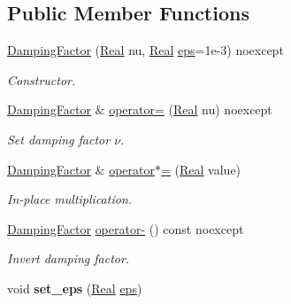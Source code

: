 \subsection*{\-Public \-Member \-Functions}
\begin{DoxyCompactItemize}
\item 
\hyperlink{classSpacy_1_1DampingFactor_a70e93ad9b0245cbc644d0f930d0cadc0}{\-Damping\-Factor} (\hyperlink{classSpacy_1_1Real}{\-Real} nu, \hyperlink{classSpacy_1_1Real}{\-Real} \hyperlink{classSpacy_1_1Mixin_1_1Eps_a812b99b0abc1d78a34b4114907f23f52}{eps}=1e-\/3) noexcept
\begin{DoxyCompactList}\small\item\em \-Constructor. \end{DoxyCompactList}\item 
\hyperlink{classSpacy_1_1DampingFactor}{\-Damping\-Factor} \& \hyperlink{classSpacy_1_1DampingFactor_ae28aa1372882e7cc94ff64e16835e7bd}{operator=} (\hyperlink{classSpacy_1_1Real}{\-Real} nu) noexcept
\begin{DoxyCompactList}\small\item\em \-Set damping factor $\nu$. \end{DoxyCompactList}\item 
\hypertarget{classSpacy_1_1DampingFactor_a58e54413ae9d5a78e90a7f99c58a127a}{\hyperlink{classSpacy_1_1DampingFactor}{\-Damping\-Factor} \& \hyperlink{classSpacy_1_1DampingFactor_a58e54413ae9d5a78e90a7f99c58a127a}{operator$\ast$=} (\hyperlink{classSpacy_1_1Real}{\-Real} value)}\label{classSpacy_1_1DampingFactor_a58e54413ae9d5a78e90a7f99c58a127a}

\begin{DoxyCompactList}\small\item\em \-In-\/place multiplication. \end{DoxyCompactList}\item 
\hypertarget{classSpacy_1_1DampingFactor_ad5f845e6bbf9f232e09aeea07ab4c32e}{\hyperlink{classSpacy_1_1DampingFactor}{\-Damping\-Factor} \hyperlink{classSpacy_1_1DampingFactor_ad5f845e6bbf9f232e09aeea07ab4c32e}{operator-\/} () const noexcept}\label{classSpacy_1_1DampingFactor_ad5f845e6bbf9f232e09aeea07ab4c32e}

\begin{DoxyCompactList}\small\item\em \-Invert damping factor. \end{DoxyCompactList}\item 
\hypertarget{classSpacy_1_1Mixin_1_1Eps_a818ab6dfab5e4eea583e1302bcc621f8}{void {\bfseries set\-\_\-eps} (\hyperlink{classSpacy_1_1Real}{\-Real} \hyperlink{classSpacy_1_1Mixin_1_1Eps_a812b99b0abc1d78a34b4114907f23f52}{eps})}\label{classSpacy_1_1Mixin_1_1Eps_a818ab6dfab5e4eea583e1302bcc621f8}


\end{DoxyCompactItemize}

